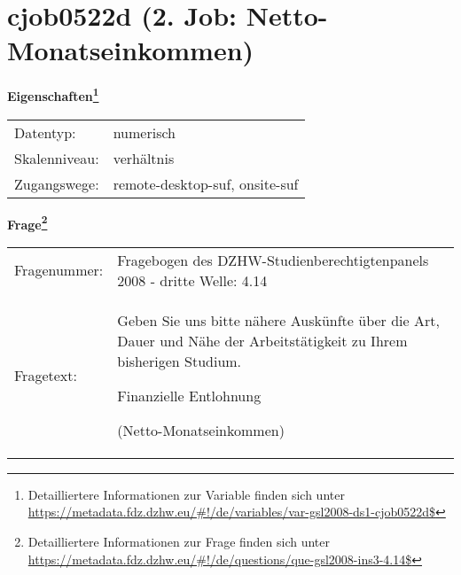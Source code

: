 
    \setcounter{footnote}{0}

    \vspace*{-1.8cm}
	\section{cjob0522d (2. Job: Netto-Monatseinkommen)}
	\label{section:cjob0522d}



    \vspace*{0.5cm}
    \noindent\textbf{Eigenschaften\footnote{Detailliertere Informationen zur Variable finden sich unter
		\url{https://metadata.fdz.dzhw.eu/\#!/de/variables/var-gsl2008-ds1-cjob0522d$}}}\\
	\begin{tabularx}{\hsize}{@{}lX}
	Datentyp: & numerisch \\
	Skalenniveau: & verhältnis \\
	Zugangswege: &
	  remote-desktop-suf, 
	  onsite-suf
 \\
    \end{tabularx}



				\vspace*{0.5cm}
                \noindent\textbf{Frage\footnote{Detailliertere Informationen zur Frage finden sich unter
		              \url{https://metadata.fdz.dzhw.eu/\#!/de/questions/que-gsl2008-ins3-4.14$}}}\\
				\begin{tabularx}{\hsize}{@{}lX}
					Fragenummer: &
					  Fragebogen des DZHW-Studienberechtigtenpanels 2008 - dritte Welle:
					  4.14
 \\
					Fragetext: & Geben Sie uns bitte nähere Auskünfte über die Art, Dauer und Nähe der Arbeitstätigkeit zu Ihrem bisherigen Studium.\par  Finanzielle Entlohnung\par  (Netto-Monatseinkommen) \\
				\end{tabularx}





